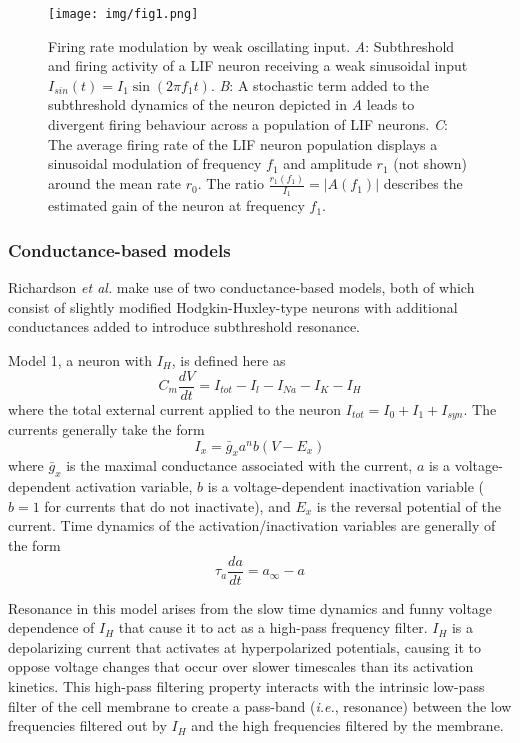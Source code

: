\documentclass[12pt]{article}
\begin{document}
\begin{figure}
    \texttt{[image: img/fig1.png]}
    \caption[Firing rate modulation by weak oscillating input]{
        Firing rate modulation by weak oscillating input.
        \textit{A}: Subthreshold and firing activity of a LIF neuron receiving a weak sinusoidal input $I_{sin}(t) = I_1 \sin(2 \pi f_1 t)$.
        \textit{B}: A stochastic term added to the subthreshold dynamics of the neuron depicted in \textit{A} leads to divergent firing behaviour across a population of LIF neurons.
        \textit{C}: The average firing rate of the LIF neuron population displays a sinusoidal modulation of frequency $f_1$ and amplitude $r_1$ (not shown) around the mean rate $r_0$.
        The ratio $\frac{r_1(f_1)}{I_1} = \vert A(f_1)\vert$ describes the estimated gain of the neuron at frequency $f_1$.
        }
    \label{fig:schematic}
\end{figure}

\subsubsection{Conductance-based models}

Richardson \textit{et al.} make use of two conductance-based models, both of which consist of slightly modified Hodgkin-Huxley-type neurons with additional conductances added to introduce subthreshold resonance.

Model 1, a neuron with $I_H$, is defined here as
\begin{equation}
    C_m \frac{dV}{dt} = I_{tot} - I_{l} - I_{Na} - I_K - I_H
\end{equation}
where the total external current applied to the neuron $I_{tot} = I_0 + I_1 + I_{syn}$. The currents generally take the form
\begin{equation}
    I_x = \bar{g}_x a^n b (V - E_x)
    \label{eqn:HHcurrent}
\end{equation}
where $\bar{g}_x$ is the maximal conductance associated with the current, $a$ is a voltage-dependent activation variable, $b$ is a voltage-dependent inactivation variable ($b = 1$ for currents that do not inactivate), and $E_x$ is the reversal potential of the current.
Time dynamics of the activation/inactivation variables are generally of the form
\begin{equation}
    \tau_a \frac{da}{dt} = a_{\infty} - a
    \label{eqn:HHtime}
\end{equation}

Resonance in this model arises from the slow time dynamics and funny voltage dependence of $I_H$ that cause it to act as a high-pass frequency filter.
$I_H$ is a depolarizing current that activates at hyperpolarized potentials, causing it to oppose voltage changes that occur over slower timescales than its activation kinetics.
This high-pass filtering property interacts with the intrinsic low-pass filter of the cell membrane to create a pass-band (\textit{i.e.}, resonance) between the low frequencies filtered out by $I_H$ and the high frequencies filtered by the membrane.
\end{document}
